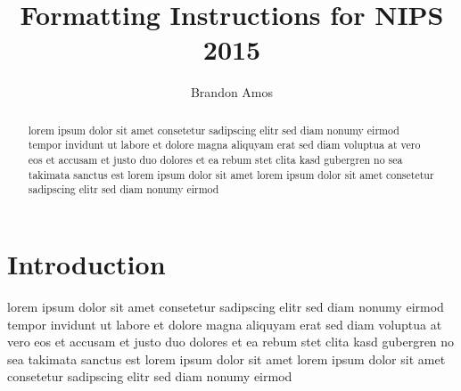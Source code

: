 \documentclass{article} %
\title{Formatting Instructions for NIPS 2015}
\author{Brandon Amos}
\begin{document}
\maketitle

\begin{abstract}
lorem ipsum dolor sit amet consetetur sadipscing elitr sed diam nonumy
eirmod tempor invidunt ut labore et dolore magna aliquyam erat sed diam
voluptua at vero eos et accusam et justo duo dolores et ea rebum stet clita
kasd gubergren no sea takimata sanctus est lorem ipsum dolor sit amet lorem
ipsum dolor sit amet consetetur sadipscing elitr sed diam nonumy eirmod
\end{abstract}

\section{Introduction}
lorem ipsum dolor sit amet consetetur sadipscing elitr sed diam nonumy
eirmod tempor invidunt ut labore et dolore magna aliquyam erat sed diam
voluptua at vero eos et accusam et justo duo dolores
et ea rebum stet clita\cite{article}
kasd gubergren no sea takimata sanctus est lorem ipsum dolor sit amet lorem
ipsum dolor sit amet consetetur sadipscing elitr sed diam nonumy eirmod



\end{document}
